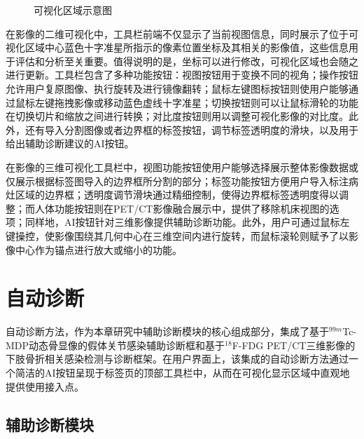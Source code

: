 \begin{figure}[htbp]
{    \label{fig:chap05_view_3D}
  }
  \newline
  \caption{可视化区域示意图}\label{fig:chap05_view}
\end{figure}

在影像的二维可视化中，工具栏前端不仅显示了当前视图信息，同时展示了位于可视化区域中心蓝色十字准星所指示的像素位置坐标及其相关的影像值，这些信息用于评估和分析至关重要。值得说明的是，坐标可以进行修改，可视化区域也会随之进行更新。工具栏包含了多种功能按钮：视图按钮用于变换不同的视角；操作按钮允许用户复原图像、执行旋转及进行镜像翻转；鼠标左键图标按钮则使用户能够通过鼠标左键拖拽影像或移动蓝色虚线十字准星；切换按钮则可以让鼠标滑轮的功能在切换切片和缩放之间进行转换；对比度按钮则用以调整可视化影像的对比度。此外，还有导入分割图像或者边界框的标签按钮，调节标签透明度的滑块，以及用于给出辅助诊断建议的AI按钮。

在影像的三维可视化工具栏中，视图功能按钮使用户能够选择展示整体影像数据或仅展示根据标签图导入的边界框所分割的部分；标签功能按钮方便用户导入标注病灶区域的边界框；透明度调节滑块通过精细控制，使得边界框标签透明度得以调整；而人体功能按钮则在PET/CT影像融合展示中，提供了移除机床视图的选项；同样地，AI按钮针对三维影像提供辅助诊断功能。此外，用户可通过鼠标左键操控，使影像围绕其几何中心在三维空间内进行旋转，而鼠标滚轮则赋予了以影像中心作为锚点进行放大或缩小的功能。

\section{自动诊断}


自动诊断方法，作为本章研究中辅助诊断模块的核心组成部分，集成了基于\(^{99m}\)Tc-MDP动态骨显像的假体关节感染辅助诊断框和基于\(^{18}\)F-FDG PET/CT三维影像的下肢骨折相关感染检测与诊断框架。在用户界面上，该集成的自动诊断方法通过一个简洁的AI按钮呈现于标签页的顶部工具栏中，从而在可视化显示区域中直观地提供使用接入点。

\subsection{辅助诊断模块}

